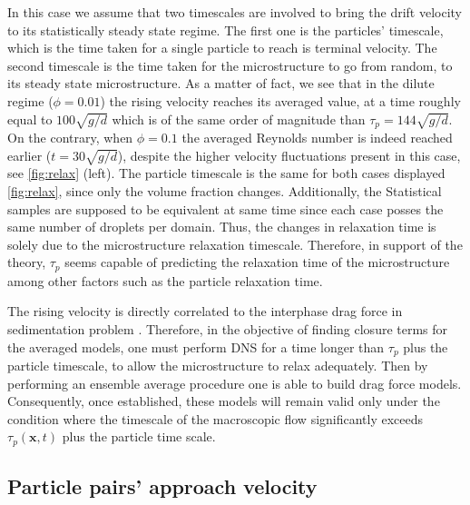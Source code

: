 In this case we assume that two timescales are involved to bring the drift velocity to its statistically steady state regime. 
The first one is the particles' timescale, which is the time taken for a single particle to reach is terminal velocity. 
The second timescale is the time taken for the microstructure to go from random, to its steady state microstructure. 
As a matter of fact, we see that in the dilute regime ($\phi=0.01$) the rising velocity reaches its averaged value, at a time roughly equal to $100\sqrt{g/d}$ which is of the same order of magnitude than $\tau_p = 144\sqrt{g/d}$. 
On the contrary, when $\phi =0.1$ the averaged Reynolds number is indeed reached earlier ($t = 30\sqrt{g/d}$), despite the higher velocity fluctuations present in this case, see \ref{fig:relax} (left). 
The particle timescale is the same for both cases displayed \ref{fig:relax}, since only the volume fraction changes.
Additionally, the Statistical samples are supposed to be equivalent at same time since each  case posses the same number of droplets per domain. 
Thus, the changes in relaxation time is solely due to the microstructure relaxation timescale. 
Therefore, in support of the theory, $\tau_p$ seems capable of predicting the relaxation time of the microstructure among other factors such as the particle relaxation time.


The rising velocity is directly correlated to the interphase drag force in sedimentation problem \citep{jackson1997locally}. 
Therefore, in the objective of finding closure terms for the averaged models, one must perform DNS for a time longer than $\tau_p$ plus the particle timescale, to allow the microstructure to relax adequately.
Then by performing an ensemble average procedure one is able to build drag force models. 
Consequently, once established, these models will remain valid only under the condition where the timescale of the macroscopic flow significantly exceeds $\tau_p(\textbf{x},t)$ plus the particle time scale.

\subsection{Particle pairs' approach velocity}


